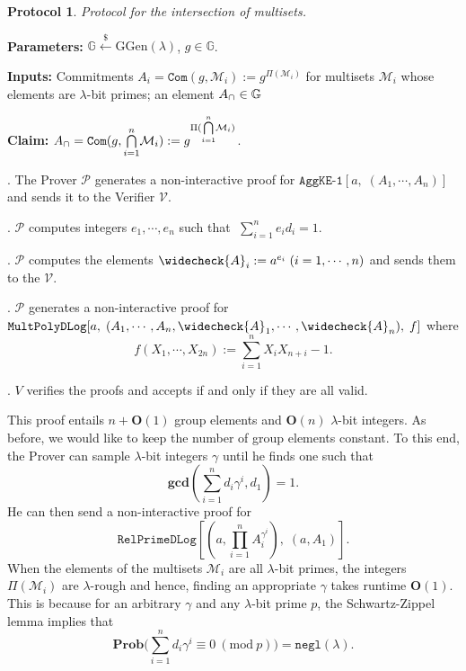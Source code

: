 \documentclass[11pt, lettersize, notitlepage, leqno, footskip=0.6cm]{article}
\newcommand{\pl}{\prod\limits}
\newcommand{\slim}{\sum\limits}
\newcommand{\ttt}{\texttt}
\newcommand{\negl}{\ttt{{negl}}}
\newcommand{\mc}{\mathcal}
\newcommand{\mb}{\mathbb}
\newcommand{\mbf}{\mathbf}
\newcommand{\mr}{\mathrm}
\newcommand{\lam}{\lambda}
\newcommand{\lamb}{\lambda}
\newcommand{\weck}{\widecheck}
\newcommand{\bO}{\mbf{O}}
\newcommand{\mP}{\mc{P}}
\newcommand{\V}{\mc{V}}
\newcommand{\mcM}{\mc{M}}
\newcommand{\vs}{\vspace{-0.15cm}}
\newcommand{\noin}{\noindent}
\newcommand{\Mod}[1]{\ (\mathrm{mod}\ #1)}
\newcommand{\GCD}{\mbf{gcd}}
\newtheorem{Prot}[Thm]{Protocol}
\numberwithin{equation}{section}
\begin{document}
\begin{Prot} Protocol for the intersection of multisets.\end{Prot} \vspace{-0.3cm}

\noin \textbf{Parameters:} $\mb{G}\xleftarrow{\$} \mr{GGen}(\lamb)$,\; $g\in \mb{G}$.

\noin \textbf{Inputs:} Commitments $A_i = \ttt{Com}(g, \mcM_i) := g^{\Pi(\mc{M}_i)}$ for multisets $\mc{M}_i$ whose elements are $\lam$-bit primes; an element $A_{\tt{\cap}}\in\mb{G}$

\noin \textbf{Claim:} $A_{\tt{\cap}} = \protect{\verb|Com|}(g, {\bigcap\limits_{i=1}^n} \mc{M}_i) := g^{\Pi({\bigcap\limits_{i=1}^n} \mc{M}_i)}$.

\begin{prf1}\normalfont \noin 1. The Prover $\mP$ generates a non-interactive proof for $\ttt{AggKE-1}[a,\;(A_1,\cdots,A_n)]$ and sends it to the Verifier $\V$.

\noin 2. $\mP$ computes integers $e_1,\cdots,e_n$ such that $\;\slim_{i=1}^n e_id_i = 1$.

\noin 3. $\mP$ computes the elements $\weck{A}_i := a^{e_i}\; (i=1,\cdots,n)$ and sends them to the $\V$.

\noin 4. $\mP$ generates a non-interactive proof for $\ttt{MultPolyDLog}[a,\; (A_1,\cdots,A_n, \weck{A}_1,\cdots,\weck{A}_n),\;f]$ where \vs $$f(X_1,\cdots,X_{2n}):= \slim_{i=1}^n X_iX_{n+i} - 1. $$

\noin 5. $V$ verifies the proofs and accepts if and only if they are all valid.\end{prf1}

This proof entails $n+\bO(1)$ group elements and $\bO(n)$ $\lam$-bit integers. As before, we would like to keep the number of group elements constant. To this end, the Prover can sample $\lam$-bit integers $\gamma$ until he finds one such that \vs $$\GCD(\slim_{i=1}^n d_i\gamma^i, d_1) = 1 .$$ He can then send a non-interactive proof for \vs $$\ttt{RelPrimeDLog}[(a,\pl_{i=1}^n A_i^{\gamma^i}),\;(a, A_1)].$$ When the elements of the multisets $\mc{M}_i$ are all $\lam$-bit primes, the integers $\Pi(\mcM_i)$ are $\lam$-rough and hence, finding an appropriate $\gamma$ takes runtime $\bO(1)$. This is because for an arbitrary $\gamma$ and any $\lam$-bit prime $p$, the Schwartz-Zippel lemma implies that \vs $$\mbf{Prob}\big(\slim_{i=1}^n d_i\gamma^i \equiv 0\Mod{p} \big) = \negl(\lam). $$ 
\end{document}
